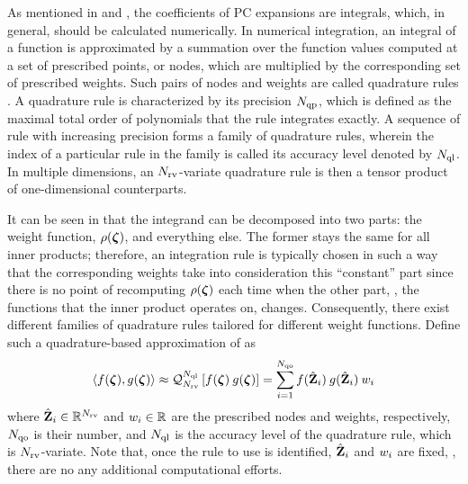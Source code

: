 As mentioned in  and , the coefficients of PC expansions are integrals, which, in general, should be calculated numerically. In numerical integration, an integral of a function is approximated by a summation over the function values computed at a set of prescribed points, or nodes, which are multiplied by the corresponding set of prescribed weights. Such pairs of nodes and weights are called quadrature rules \cite{press2007}. A quadrature rule is characterized by its precision $N_\text{qp}$, which is defined as the maximal total order of polynomials that the rule integrates exactly. A sequence of rule with increasing precision forms a family of quadrature rules, wherein the index of a particular rule in the family is called its accuracy level denoted by $N_\text{ql}$. In multiple dimensions, an ${N_\text{rv}}$-variate quadrature rule is then a tensor product of one-dimensional counterparts.

It can be seen in  that the integrand can be decomposed into two parts: the weight function, $\rho(\boldsymbol{\zeta})$, and everything else. The former stays the same for all inner products; therefore, an integration rule is typically chosen in such a way that the corresponding weights take into consideration this ``constant'' part since there is no point of recomputing $\rho(\boldsymbol{\zeta})$ each time when the other part, \ie, the functions that the inner product operates on, changes. Consequently, there exist different families of quadrature rules tailored for different weight functions. Define such a quadrature-based approximation of  as
\[
  \oInner{f(\vz)}{g(\vz)} \approx \oQuad{\vars}{\qdlevel}{f(\vz) \: g(\vz)} = \sum_{i = 1}^{\qdorder} f(\qdn{\vZ}_i) \: g(\qdn{\vZ}_i) \: \qdw_i
\]
where $\hat{\mathbf{Z}}_i \in \mathbb{R}^{N_\text{rv}}$ and $w_i \in \mathbb{R}$ are the prescribed nodes and weights, respectively, $N_\text{qo}$ is their number, and $N_\text{ql}$ is the accuracy level of the quadrature rule, which is ${N_\text{rv}}$-variate. Note that, once the rule to use is identified, $\hat{\mathbf{Z}}_i$ and $w_i$ are fixed, \ie, there are no any additional computational efforts.

